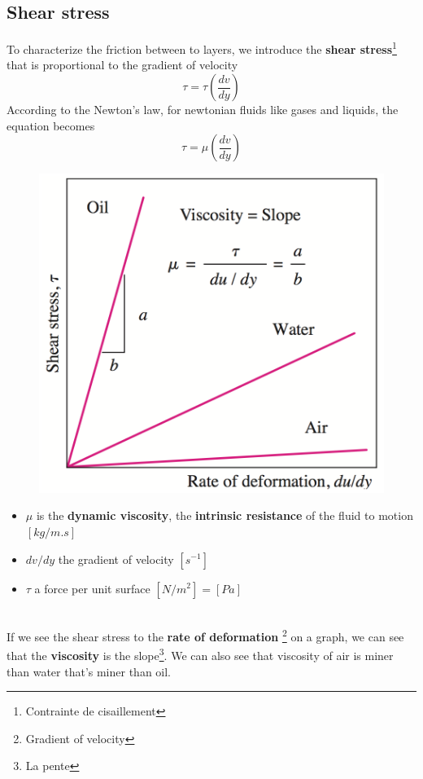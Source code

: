 \subsection{Shear stress}
	To characterize the friction between to layers, we introduce the \textbf{shear stress}\footnote{Contrainte de cisaillement} that is proportional to the gradient of velocity
	\begin{equation}
		\tau = \tau \left( \frac{dv}{dy} \right)
	\end{equation}
	According to the Newton's law, for newtonian fluids like gases and liquids, the equation becomes
	\begin{equation}
		\tau = \mu \left( \frac{dv}{dy} \right)
	\end{equation}
	\begin{figure}
	\includegraphics[scale=0.26]{ch1/5}
	\end{figure}
	\begin{itemize}
		\item $\mu$ is the \textbf{dynamic viscosity}, the \textbf{intrinsic resistance} of the fluid to motion $[kg/m.s]$
		\item $dv/dy$ the gradient of velocity $[s^{-1}]$
		\item $\tau$ a force per unit surface $[N/m^2] = [Pa]$
	\end{itemize}
	\ \\
	If we see the shear stress to the \textbf{rate of deformation} \footnote{Gradient of velocity} on a graph, we can see that the \textbf{viscosity} is the slope\footnote{La pente}. We can also see that viscosity of air is miner than water that's miner than oil. 
	
